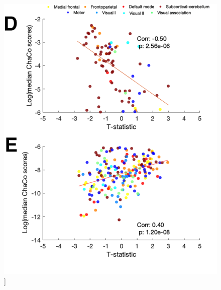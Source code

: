 \documentclass[phd,tocprelim]{cornell}
\renewcommand{\caption}[1]{\singlespacing\hangcaption{#1}\normalspacing}
\begin{document}
\null
\vfill
\clearpage
\null
\vfill
\begin{figure}[h!]
		\ContinuedFloat
		\captionsetup{labelformat=adja-page}
    \centering
    \includegraphics[width=\textwidth]{chapter1/SupplementaryFigure12DE.png}
    \caption[]{}
\end{figure}
\null
\vfill
\clearpage
\null
\vfill
\end{document}
